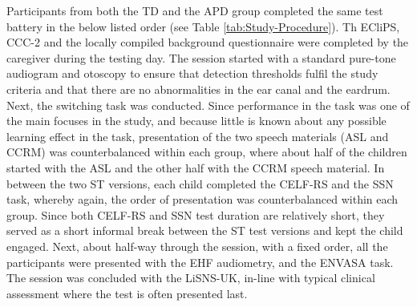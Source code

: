 \documentclass[a4paper, twoside]{templates/ociamthesis}
\begin{document}
Participants from both the TD and the APD group completed the same test battery in the below listed order (see Table \ref{tab:Study-Procedure}). Th ECliPS, CCC-2 and the locally compiled background questionnaire were completed by the caregiver during the testing day. The session started with a standard pure-tone audiogram and otoscopy to ensure that detection thresholds fulfil the study criteria and that there are no abnormalities in the ear canal and the eardrum. Next, the switching task was conducted. Since performance in the task was one of the main focuses in the study, and because little is known about any possible learning effect in the task, presentation of the two speech materials (ASL and CCRM) was counterbalanced within each group, where about half of the children started with the ASL and the other half with the CCRM speech material. In between the two ST versions, each child completed the CELF-RS and the SSN task, whereby again, the order of presentation was counterbalanced within each group. Since both CELF-RS and SSN test duration are relatively short, they served as a short informal break between the ST test versions and kept the child engaged. Next, about half-way through the session, with a fixed order, all the participants were presented with the EHF audiometry, and the ENVASA task. The session was concluded with the LiSNS-UK, in-line with typical clinical assessment where the test is often presented last.\\

\begin{table}

\caption{\label{tab:Study-Procedure}Experimental design and measurements order.}
\centering
{}
\end{table}
\end{document}
